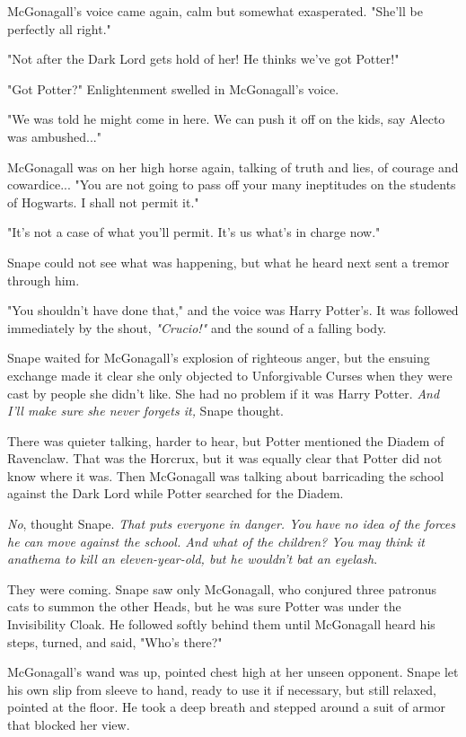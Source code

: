 \documentclass[a4paper,11pt]{article}
\begin{document}
McGonagall's voice came again, calm but somewhat exasperated. "She'll be perfectly all right."

"Not after the Dark Lord gets hold of her! He thinks we've got Potter!"

"Got Potter?" Enlightenment swelled in McGonagall's voice.

"We was told he might come in here. We can push it off on the kids, say Alecto was ambushed..."

McGonagall was on her high horse again, talking of truth and lies, of courage and cowardice... "You are not going to pass off your many ineptitudes on the students of Hogwarts. I shall not permit it."

"It's not a case of what you'll permit. It's us what's in charge now."

Snape could not see what was happening, but what he heard next sent a tremor through him.

"You shouldn't have done that," and the voice was Harry Potter's. It was followed immediately by the shout, \emph{"Crucio!"} and the sound of a falling body.

Snape waited for McGonagall's explosion of righteous anger, but the ensuing exchange made it clear she only objected to Unforgivable Curses when they were cast by people she didn't like. She had no problem if it was Harry Potter. \emph{And I'll make sure she never forgets it,} Snape thought.

There was quieter talking, harder to hear, but Potter mentioned the Diadem of Ravenclaw. That was the Horcrux, but it was equally clear that Potter did not know where it was. Then McGonagall was talking about barricading the school against the Dark Lord while Potter searched for the Diadem.

\emph{No}, thought Snape. \emph{That puts everyone in danger. You have no idea of the forces he can move against the school. And what of the children? You may think it anathema to kill an eleven-year-old, but he wouldn't bat an eyelash}.

They were coming. Snape saw only McGonagall, who conjured three patronus cats to summon the other Heads, but he was sure Potter was under the Invisibility Cloak. He followed softly behind them until McGonagall heard his steps, turned, and said, "Who's there?"

McGonagall's wand was up, pointed chest high at her unseen opponent. Snape let his own slip from sleeve to hand, ready to use it if necessary, but still relaxed, pointed at the floor. He took a deep breath and stepped around a suit of armor that blocked her view.
\end{document}
